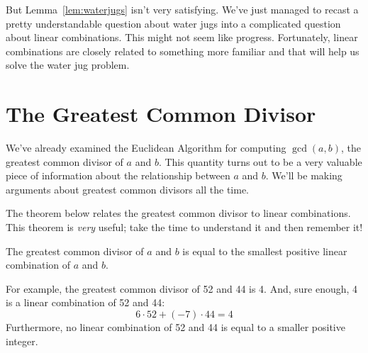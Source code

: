 But Lemma~\ref{lem:waterjugs} isn't very satisfying.  We've just managed
to recast a pretty understandable question about water jugs into a
complicated question about linear combinations.  This might not seem like
progress.  Fortunately, linear combinations are closely related to
something more familiar and that will help us solve the water jug problem.



\section{The Greatest Common Divisor}
\label{sec:gcd}

We've already examined the Euclidean Algorithm for computing $\gcd(a, b)$,
the greatest common divisor of $a$ and $b$.  This quantity turns out to be
a very valuable piece of information about the relationship between $a$
and $b$.  We'll be making arguments about greatest common divisors all
the time.


The theorem below relates the greatest common divisor to linear
combinations.  This theorem is \textit{very} useful; take the time to
understand it and then remember it!

\begin{theorem}
\label{th:gcd}
The greatest common divisor of $a$ and $b$ is equal to the smallest
positive linear combination of $a$ and $b$.
\end{theorem}

For example, the greatest common divisor of 52 and 44 is 4.  And, sure
enough, 4 is a linear combination of 52 and 44:
%
\[
6 \cdot 52 + (-7) \cdot 44  =  4
\]
%
Furthermore, no linear combination of 52 and 44 is equal to a smaller
positive integer.

